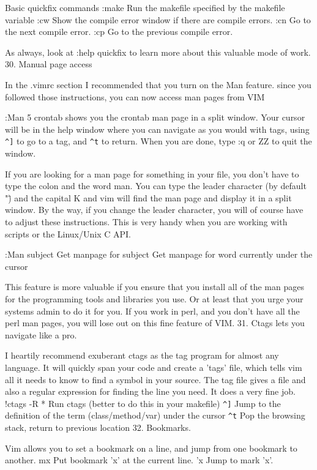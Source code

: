 \documentclass[a4paper, 12pt]{article}
\begin{document}
      Basic quickfix commands
      :make	Run the makefile specified by the makefile variable
      :cw	Show the compile error window if there are compile errors.
      :cn	Go to the next compile error.
      :cp	Go to the previous compile error.

      As always, look at :help quickfix to learn more about this valuable mode of work.
  30. Manual page access

      In the .vimrc section I recommended that you turn on the Man feature. since you followed those instructions, you can now access man pages from VIM

      :Man 5 crontab shows you the crontab man page in a split window. Your cursor will be in the help window where you can navigate as you would with tags, using \texttt{\^{}]} to go to a tag, and \texttt{\^{}t} to return. When you are done, type :q or ZZ to quit the window.

      If you are looking for a man page for something in your file, you don't have to type the colon and the word man. You can type the leader character (by default "\") and the capital K and vim will find the man page and display it in a split window. By the way, if you change the leader character, you will of course have to adjust these instructions. This is very handy when you are working with scripts or the Linux/Unix C API.

      :Man subject	Get manpage for subject
      \K	Get manpage for word currently under the cursor

      This feature is more valuable if you ensure that you install all of the man pages for the programming tools and libraries you use. Or at least that you urge your systems admin to do it for you. If you work in perl, and you don't have all the perl man pages, you will lose out on this fine feature of VIM.
  31. Ctags lets you navigate like a pro.

      I heartily recommend exuberant ctags as the tag program for almost any language. It will quickly span your code and create a 'tags' file, which tells vim all it needs to know to find a symbol in your source. The tag file gives a file and also a regular expression for finding the line you need. It does a very fine job.
      !ctags -R *	Run ctags (better to do this in your makefile)
      \texttt{\^{}]}	Jump to the definition of the term (class/method/var) under the cursor
      \texttt{\^{}t}	Pop the browsing stack, return to previous location
  32. Bookmarks.

      Vim allows you to set a bookmark on a line, and jump from one bookmark to another.
      mx	Put bookmark 'x' at the current line.
      'x	Jump to mark 'x'.
\end{document}
